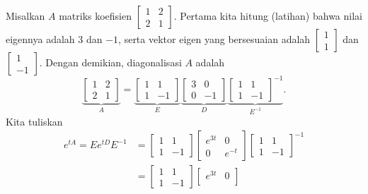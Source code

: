 \begin{example}
Misalkan $A$ matriks koefisien $\left[ \begin{smallmatrix}
1 & 2 \\
2 & 1
\end{smallmatrix} \right]$.
Pertama kita hitung (latihan) bahwa nilai eigennya adalah 3 dan $-1$, serta 
vektor eigen yang bersesuaian adalah
$\left[ \begin{smallmatrix} 1 \\ 1 \end{smallmatrix} \right]$ dan
$\left[ \begin{smallmatrix} 1 \\ -1 \end{smallmatrix} \right]$.
Dengan demikian, diagonalisasi $A$ adalah
\begin{equation*}
\underbrace{
\begin{bmatrix}
1 & 2 \\
2 & 1
\end{bmatrix}
}_{A}
=
\underbrace{
\begin{bmatrix}
1 & 1 \\
1 & -1
\end{bmatrix}
}_{E}
\underbrace{
\begin{bmatrix}
3 & 0 \\
0 & -1
\end{bmatrix}
}_{D}
\underbrace{
\begin{bmatrix}
1 & 1 \\
1 & -1
\end{bmatrix}^{-1}
}_{E^{-1}} .
\end{equation*}
Kita tuliskan
\begin{equation*}
\begin{split}
e^{t A}
=
E e^{tD} E^{-1}
& =
\begin{bmatrix}
1 & 1 \\
1 & -1
\end{bmatrix}
\begin{bmatrix}
e^{3t} & 0 \\
0 & e^{-t}
\end{bmatrix}
\begin{bmatrix}
1 & 1 \\
1 & -1
\end{bmatrix}^{-1}
\\
& =
\begin{bmatrix}
1 & 1 \\
1 & -1
\end{bmatrix}
\begin{bmatrix}
e^{3t} & 0 \\

\end{bmatrix}
\end{split}
\end{equation*}
\end{example}
